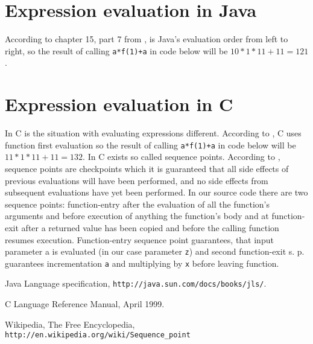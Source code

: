 \documentclass[5pt]{article}
\begin{document}
\maketitle

\section{Expression evaluation in Java}
According to chapter 15, part 7 from \cite{java:jls},
is Java's evaluation order from left to right, so the result of calling
\verb|a*f(1)+a| in code below will be $10 * 1*11 + 11 = 121$.\newline


\section{Expression evaluation in C}
In C is the situation with evaluating expressions different. According to
\cite{c:lrm}, C uses function first evaluation so the result of calling
\verb|a*f(1)+a| in code below will be $11 * 1*11 + 11 = 132$. In C exists so
called sequence points. According to \cite{wiki:encyclopedia}, sequence points
are checkpoints which it is guaranteed that all side effects of previous evaluations will have been performed, and no
side effects from subsequent evaluations have yet been performed. In our source
code there are two sequence points: function-entry after the evaluation of all
the function's arguments and before execution of anything the function's body
and at function-exit after a returned value has been copied and before the
calling function resumes execution. Function-entry sequence point guarantees,
that input parameter a is evaluated (in our case parameter \verb|z|) and second
function-exit s. p. guarantees incrementation \verb|a| and multiplying by
\verb|x| before leaving function.



\begin{thebibliography}{1}

Java Language specification, \verb|http://java.sun.com/docs/books/jls/|.

C Language Reference Manual, April
1999.

Wikipedia, The Free Encyclopedia,
\verb|http://en.wikipedia.org/wiki/Sequence_point|

\end{thebibliography}
\end{document}
